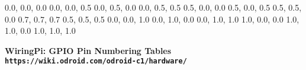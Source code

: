 \documentclass[11pt,a4paper]{article}
\begin{document}
\begin{sffamily}
\definecolor{rtb-black}{rgb}  {0.0, 0.0, 0.0}
\definecolor{rtb-navy}{rgb}   {0.0, 0.0, 0.5}
\definecolor{rtb-green}{rgb}  {0.0, 0.5, 0.0}
\definecolor{rtb-teal}{rgb}   {0.0, 0.5, 0.5}
\definecolor{rtb-maroon}{rgb} {0.5, 0.0, 0.0}
\definecolor{rtb-purple}{rgb} {0.5, 0.0, 0.5}
\definecolor{rtb-olive}{rgb}  {0.5, 0.5, 0.0}
\definecolor{rtb-silver}{rgb} {0.7, 0.7, 0.7}
\definecolor{rtb-grey}{rgb}   {0.5, 0.5, 0.5}
\definecolor{rtb-blue}{rgb}   {0.0, 0.0, 1.0}
\definecolor{rtb-lime}{rgb}   {0.0, 1.0, 0.0}
\definecolor{rtb-aqua}{rgb}   {0.0, 1.0, 1.0}
\definecolor{rtb-red}{rgb}    {1.0, 0.0, 0.0}
\definecolor{rtb-yellow}{rgb} {1.0, 1.0, 0.0}
\definecolor{rtb-white}{rgb}  {1.0, 1.0, 1.0}

\begin{center}
\bfseries{WiringPi: GPIO Pin Numbering Tables}\\
\tt{https://wiki.odroid.com/odroid-c1/hardware/}
\end{center}


\end{sffamily}
\end{document}
